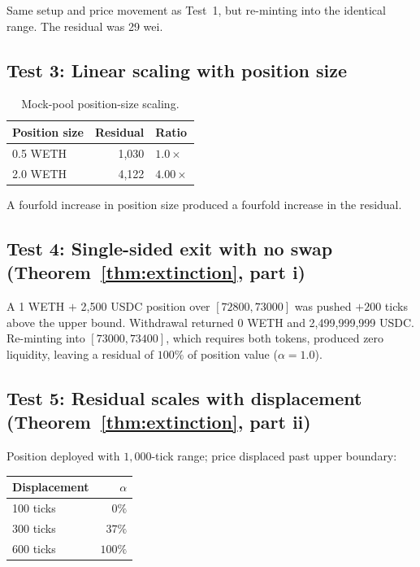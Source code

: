\documentclass{manuscript}
\begin{document}
Same setup and price movement as Test~1, but re-minting into the identical range. The residual was 29 wei.

\subsection{Test 3: Linear scaling with position size}\label{sec:foundry-mock-scaling}

\begin{table}[H]
\centering
\caption{Mock-pool position-size scaling.}
\label{tab:foundry-scaling}
\begin{tabular}{@{}lrl@{}}
\toprule
Position size & Residual & Ratio \\
\midrule
0.5 WETH & 1{,}030 & $1.0\times$ \\
2.0 WETH & 4{,}122 & $4.00\times$ \\
\bottomrule
\end{tabular}
\end{table}

\noindent A fourfold increase in position size produced a fourfold increase in the residual.

\subsection{Test 4: Single-sided exit with no swap (Theorem~\ref{thm:extinction}, part i)}\label{sec:foundry-mock-extinction}

A 1 WETH $+$ 2{,}500 USDC position over $[72800, 73000]$ was pushed $+200$ ticks above the upper bound. Withdrawal returned 0 WETH and 2{,}499{,}999{,}999 USDC. Re-minting into $[73000, 73400]$, which requires both tokens, produced zero liquidity, leaving a residual of $100\%$ of position value ($\alpha = 1.0$).

\subsection{Test 5: Residual scales with displacement (Theorem~\ref{thm:extinction}, part ii)}\label{sec:foundry-displacement}

Position deployed with $1{,}000$-tick range; price displaced past upper boundary:

\begin{table}[H]
\centering
\begin{tabular}{@{}lr@{}}
\toprule
Displacement & $\alpha$ \\
\midrule
100 ticks & $0\%$ \\
300 ticks & $37\%$ \\
600 ticks & $100\%$ \\
\bottomrule
\end{tabular}
\end{table}
\end{document}
